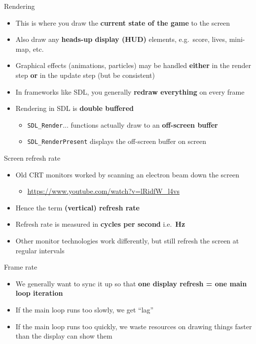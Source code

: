 \begin{frame}{Rendering}
    \begin{itemize}
        \item This is where you draw the \textbf{current state of the game} to the screen \pause
        \item Also draw any \textbf{heads-up display (HUD)} elements,
            e.g.\ score, lives, mini-map, etc. \pause
        \item Graphical effects (animations, particles) may be handled \textbf{either} in the render step
            \textbf{or} in the update step (but be consistent) \pause
        \item In frameworks like SDL, you generally \textbf{redraw everything} on every frame \pause
        \item Rendering in SDL is \textbf{double buffered} \pause
            \begin{itemize}
                \item \lstinline{SDL_Render}... functions actually draw to an
                    \textbf{off-screen buffer} \pause
                \item \lstinline{SDL_RenderPresent} displays the off-screen buffer on screen
            \end{itemize}
    \end{itemize}
\end{frame}

\begin{frame}{Screen refresh rate}
    \begin{itemize}
        \item Old CRT monitors worked by scanning an electron beam down the screen
            \begin{itemize}
                \item \url{https://www.youtube.com/watch?v=lRidfW_l4vs} \pause
            \end{itemize}
        \item Hence the term \textbf{(vertical) refresh rate} \pause
        \item Refresh rate is measured in \textbf{cycles per second} i.e.\ \textbf{Hz} \pause
        \item Other monitor technologies work differently, but still refresh the screen at regular intervals
    \end{itemize}
\end{frame}

\begin{frame}{Frame rate}
    \begin{itemize}
        \item We generally want to sync it up so that \newline
            \textbf{one display refresh = one main loop iteration} \pause
        \item If the main loop runs too slowly, we get ``lag'' \pause
        \item If the main loop runs too quickly, we waste resources on drawing things faster than the display can show them
    \end{itemize}
\end{frame}

